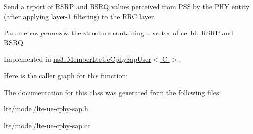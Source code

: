 Send a report of R\+S\+RP and R\+S\+RQ values perceived from P\+SS by the P\+HY entity (after applying layer-\/1 filtering) to the R\+RC layer. 


\begin{DoxyParams}{Parameters}
{\em params} & the structure containing a vector of cell\+Id, R\+S\+RP and R\+S\+RQ \\
\hline
\end{DoxyParams}


Implemented in \hyperlink{classns3_1_1MemberLteUeCphySapUser_ab9a2ac93ed4e88724b8044ceefbeede7}{ns3\+::\+Member\+Lte\+Ue\+Cphy\+Sap\+User$<$ C $>$}.



Here is the caller graph for this function\+:




The documentation for this class was generated from the following files\+:\begin{DoxyCompactItemize}
\item 
lte/model/\hyperlink{lte-ue-cphy-sap_8h}{lte-\/ue-\/cphy-\/sap.\+h}\item 
lte/model/\hyperlink{lte-ue-cphy-sap_8cc}{lte-\/ue-\/cphy-\/sap.\+cc}\end{DoxyCompactItemize}
